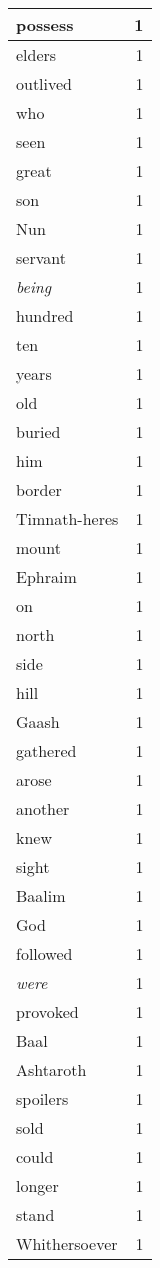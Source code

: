 \begin{center}
\begin{longtable}{l|r}
possess & 1 \\ \hline
elders & 1 \\ \hline
outlived & 1 \\ \hline
who & 1 \\ \hline
seen & 1 \\ \hline
great & 1 \\ \hline
son & 1 \\ \hline
Nun & 1 \\ \hline
servant & 1 \\ \hline
\emph{being} & 1 \\ \hline
hundred & 1 \\ \hline
ten & 1 \\ \hline
years & 1 \\ \hline
old & 1 \\ \hline
buried & 1 \\ \hline
him & 1 \\ \hline
border & 1 \\ \hline
Timnath-heres & 1 \\ \hline
mount & 1 \\ \hline
Ephraim & 1 \\ \hline
on & 1 \\ \hline
north & 1 \\ \hline
side & 1 \\ \hline
hill & 1 \\ \hline
Gaash & 1 \\ \hline
gathered & 1 \\ \hline
arose & 1 \\ \hline
another & 1 \\ \hline
knew & 1 \\ \hline
sight & 1 \\ \hline
Baalim & 1 \\ \hline
God & 1 \\ \hline
followed & 1 \\ \hline
\emph{were} & 1 \\ \hline
provoked & 1 \\ \hline
Baal & 1 \\ \hline
Ashtaroth & 1 \\ \hline
spoilers & 1 \\ \hline
sold & 1 \\ \hline
could & 1 \\ \hline
longer & 1 \\ \hline
stand & 1 \\ \hline
Whithersoever & 1 \\ \hline

\end{longtable}
\end{center}
